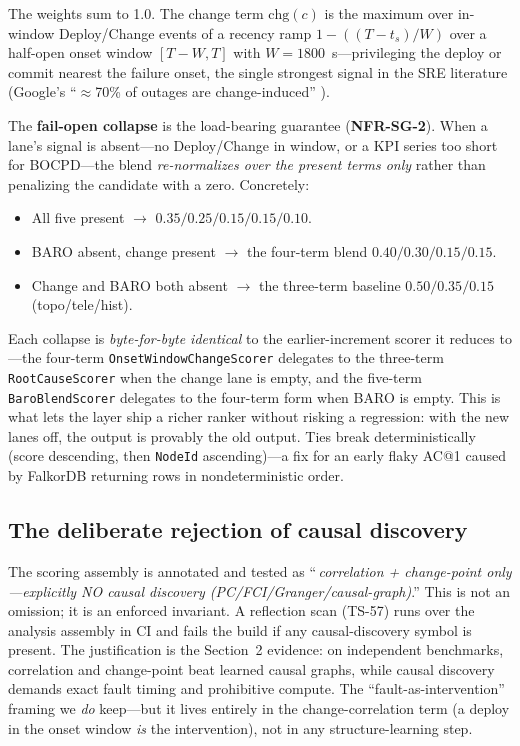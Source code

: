 \documentclass[11pt]{article}
\begin{document}
The weights sum to 1.0. The change term $\text{chg}(c)$ is the maximum over
in-window Deploy/Change events of a recency ramp $1 - ((T - t_s)/W)$ over a
half-open onset window $[T - W, T]$ with $W = 1800$~s---privileging the deploy or
commit nearest the failure onset, the single strongest signal in the SRE
literature (Google's ``$\approx$70\% of outages are change-induced''
\citep{sre}).

The \textbf{fail-open collapse} is the load-bearing guarantee
(\textbf{NFR-SG-2}). When a lane's signal is absent---no Deploy/Change in window,
or a KPI series too short for BOCPD---the blend \emph{re-normalizes over the
present terms only} rather than penalizing the candidate with a zero. Concretely:

\begin{itemize}
  \item All five present $\to$ $0.35/0.25/0.15/0.15/0.10$.
  \item BARO absent, change present $\to$ the four-term blend $0.40/0.30/0.15/0.15$.
  \item Change and BARO both absent $\to$ the three-term baseline $0.50/0.35/0.15$
    (topo/tele/hist).
\end{itemize}

Each collapse is \emph{byte-for-byte identical} to the earlier-increment scorer it
reduces to---the four-term \texttt{OnsetWindowChangeScorer} delegates to the
three-term \texttt{RootCauseScorer} when the change lane is empty, and the
five-term \texttt{BaroBlendScorer} delegates to the four-term form when BARO is
empty. This is what lets the layer ship a richer ranker without risking a
regression: with the new lanes off, the output is provably the old output. Ties
break deterministically (score descending, then \texttt{NodeId} ascending)---a fix
for an early flaky AC@1 caused by FalkorDB returning rows in nondeterministic
order.

\subsection{The deliberate rejection of causal discovery}
\label{sec:nocausal}

The scoring assembly is annotated and tested as ``\,\emph{correlation +
change-point only---explicitly NO causal discovery (PC/FCI/Granger/causal-graph)}.''
This is not an omission; it is an enforced invariant. A reflection scan (TS-57)
runs over the analysis assembly in CI and fails the build if any causal-discovery
symbol is present. The justification is the Section~2 evidence: on independent
benchmarks, correlation and change-point beat learned causal graphs, while causal
discovery demands exact fault timing and prohibitive compute. The
``fault-as-intervention'' framing we \emph{do} keep---but it lives entirely in the
change-correlation term (a deploy in the onset window \emph{is} the intervention),
not in any structure-learning step.
\end{document}
